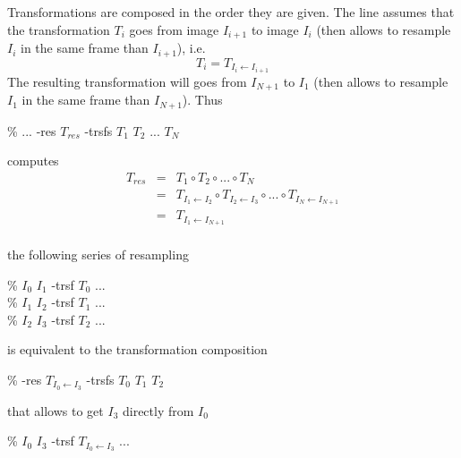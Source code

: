 Transformations are composed in the order they are given.
The line  assumes that the transformation
$T_i$ goes from image $I_{i+1}$ to image $I_{i}$ (then allows to resample
$I_{i}$ in the same frame than $I_{i+1}$), i.e.  
$$T_{i} = T_{I_{i} \leftarrow I_{i+1}}$$
The resulting transformation will goes from $I_{N+1}$ to $I_1$ 
(then allows to resample $I_1$ in the same frame than $I_{N+1}$). Thus 
\begin{code}{1}
\% \composeTrsf ... -res $T_{res}$ -trsfs  $T_1$ $T_2$ ... $T_N$
\end{code}
computes
\begin{eqnarray*}
T_{res} & = & T_1 \circ T_2 \circ ... \circ T_N \\
& = & T_{I_{1} \leftarrow I_{2}} \circ  
      T_{I_{2} \leftarrow I_{3}} \circ  ... \circ 
      T_{I_{N} \leftarrow I_{N+1}} \\
& = & T_{I_{1} \leftarrow I_{N+1}} \\
\end{eqnarray*}


 the following series of resampling
\begin{code}{1}
\% \applyTrsf $I_0$ $I_1$ -trsf $T_0$ ... \\
\% \applyTrsf $I_1$ $I_2$ -trsf $T_1$ ... \\
\% \applyTrsf $I_2$ $I_3$ -trsf $T_2$ ...
\end{code}
is equivalent to the transformation composition
\begin{code}{1}
\% \composeTrsf -res $T_{I_0 \leftarrow I_3}$ -trsfs $T_0$ $T_1$ $T_2$
\end{code}
that allows to get $I_3$ directly from $I_0$
\begin{code}{1}
\% \applyTrsf $I_0$ $I_3$ -trsf $T_{I_0 \leftarrow I_3}$ ... 
\end{code}


